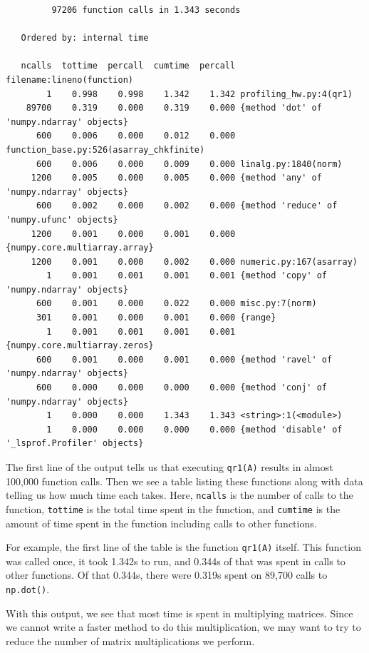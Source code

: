 {\scriptsize
\begin{verbatim}
         97206 function calls in 1.343 seconds

   Ordered by: internal time

   ncalls  tottime  percall  cumtime  percall filename:lineno(function)
        1    0.998    0.998    1.342    1.342 profiling_hw.py:4(qr1)
    89700    0.319    0.000    0.319    0.000 {method 'dot' of 'numpy.ndarray' objects}
      600    0.006    0.000    0.012    0.000 function_base.py:526(asarray_chkfinite)
      600    0.006    0.000    0.009    0.000 linalg.py:1840(norm)
     1200    0.005    0.000    0.005    0.000 {method 'any' of 'numpy.ndarray' objects}
      600    0.002    0.000    0.002    0.000 {method 'reduce' of 'numpy.ufunc' objects}
     1200    0.001    0.000    0.001    0.000 {numpy.core.multiarray.array}
     1200    0.001    0.000    0.002    0.000 numeric.py:167(asarray)
        1    0.001    0.001    0.001    0.001 {method 'copy' of 'numpy.ndarray' objects}
      600    0.001    0.000    0.022    0.000 misc.py:7(norm)
      301    0.001    0.000    0.001    0.000 {range}
        1    0.001    0.001    0.001    0.001 {numpy.core.multiarray.zeros}
      600    0.001    0.000    0.001    0.000 {method 'ravel' of 'numpy.ndarray' objects}
      600    0.000    0.000    0.000    0.000 {method 'conj' of 'numpy.ndarray' objects}
        1    0.000    0.000    1.343    1.343 <string>:1(<module>)
        1    0.000    0.000    0.000    0.000 {method 'disable' of '_lsprof.Profiler' objects}
\end{verbatim}
}


The first line of the output tells us that executing \texttt{qr1(A)} results in almost 100,000 function calls.  
Then we see a table listing these functions along with data telling us how much time each takes.
Here, \texttt{ncalls} is the number of calls to the function, \texttt{tottime} is the total time spent in the function, and \texttt{cumtime} is the amount of time spent in the function including calls to other functions.

For example, the first line of the table is the function \texttt{qr1(A)} itself. 
This function was called once, it took 1.342s to run, and 0.344s of that was spent in calls to other functions.
Of that 0.344s, there were 0.319s spent on 89,700 calls to \texttt{np.dot()}.

With this output, we see that most time is spent in multiplying matrices.
Since we cannot write a faster method to do this multiplication, we may want to try to reduce the number of matrix multiplications we perform.



